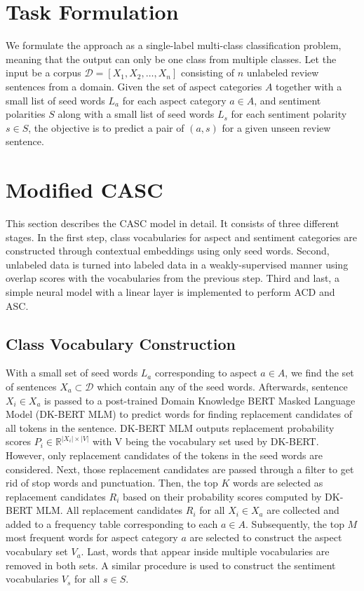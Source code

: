 \documentclass[american, oneside]{ecsgdp}
\begin{document}
\section{Task Formulation} \label{sec:formulation} %
We formulate the approach as a single-label multi-class classification problem, meaning that the output can only be one class from multiple classes. Let the input be a corpus $\mathcal{D} = [X_1, X_2, \dots, X_n]$ consisting of $n$ unlabeled review sentences from a domain. Given the set of aspect categories $A$ together with a small list of seed words $L_a$ for each aspect category $a \in A$, and sentiment polarities $S$ along with a small list of seed words $L_s$ for each sentiment polarity $s \in S$, the objective is to predict a pair of $(a, s)$ for a given unseen review sentence.

\section{Modified CASC} \label{sec:CASC}
This section describes the CASC model in detail. It consists of three different stages. In the first step, class vocabularies for aspect and sentiment categories are constructed through contextual embeddings using only seed words. Second, unlabeled data is turned into labeled data in a weakly-supervised manner using overlap scores with the vocabularies from the previous step. Third and last, a simple neural model with a linear layer is implemented to perform ACD and ASC.

\subsection{Class Vocabulary Construction}
With a small set of seed words $L_a$ corresponding to aspect $a \in A$, we find the set of sentences $X_a \subset \mathcal{D}$ which contain any of the seed words. Afterwards, sentence $X_i \in X_a$ is passed to a post-trained Domain Knowledge BERT Masked Language Model (DK-BERT MLM) to predict words for finding replacement candidates of all tokens in the sentence. DK-BERT MLM outputs replacement probability scores $P_i \in \mathbb{R}^{\lvert X_i \rvert \times \lvert V \rvert}$ with V being the vocabulary set used by DK-BERT. However, only replacement candidates of the tokens in the seed words are considered. Next, those replacement candidates are passed through a filter to get rid of stop words and punctuation. Then, the top $K$ words are selected as replacement candidates $R_i$ based on their probability scores computed by DK-BERT MLM. All replacement candidates $R_i$ for all $X_i \in X_a$ are collected and added to a frequency table corresponding to each $a \in A$. Subsequently, the top $M$ most frequent words for aspect category $a$ are selected to construct the aspect vocabulary set $V_a$. Last, words that appear inside multiple vocabularies are removed in both sets. A similar procedure is used to construct the sentiment vocabularies $V_s$ for all $s \in S$.
\end{document}
